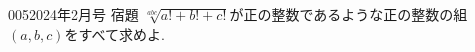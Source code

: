\begin{prob}{005}{}{2024年2月号 宿題}
 $\sqrt[abc]{a! + b! + c!}$が正の整数であるような正の整数の組$(a,b,c)$をすべて求めよ.
\end{prob}
